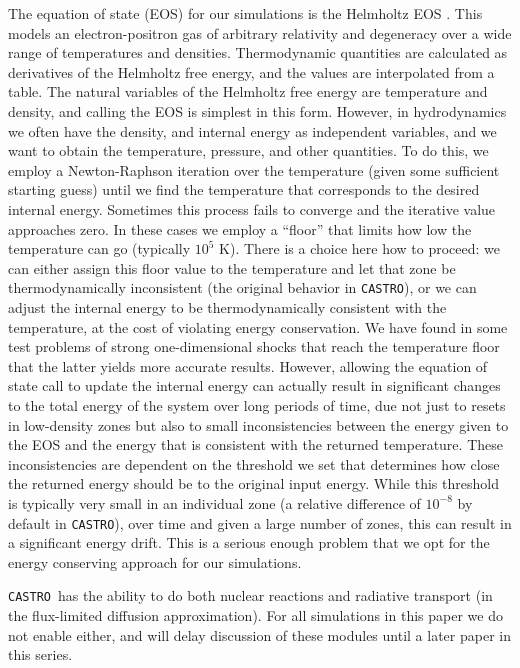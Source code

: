 \documentclass[iop]{../emulateapj}
\newcommand{\castro}{\texttt{CASTRO}}
\begin{document}
The equation of state (EOS) for our simulations is the Helmholtz EOS
\citep{timmes_swesty:2000}. This models an electron-positron gas of
arbitrary relativity and degeneracy over a wide range of temperatures
and densities. Thermodynamic quantities are calculated as derivatives
of the Helmholtz free energy, and the values are interpolated from a
table. The natural variables of the Helmholtz free energy are
temperature and density, and calling the EOS is simplest in this
form. However, in hydrodynamics we often have the density, and
internal energy as independent variables, and we want to obtain the
temperature, pressure, and other quantities. To do this, we employ a
Newton-Raphson iteration over the temperature (given some sufficient
starting guess) until we find the temperature that corresponds to the
desired internal energy. Sometimes this process fails to converge and
the iterative value approaches zero. In these cases we employ a
``floor'' that limits how low the temperature can go (typically 
$10^5$ K). There is a choice here how to proceed: we can either
assign this floor value to the temperature and let that zone be
thermodynamically inconsistent (the original behavior in \castro), or
we can adjust the internal energy to be thermodynamically consistent
with the temperature, at the cost of violating energy conservation. We
have found in some test problems of strong one-dimensional shocks that reach 
the temperature floor that the latter yields more accurate results. 
However, allowing the equation of state call to update the 
internal energy can actually result in significant changes to the 
total energy of the system over long periods of time, 
due not just to resets in low-density zones but also to small 
inconsistencies between the energy given to the EOS and the energy 
that is consistent with the returned temperature. These inconsistencies
are dependent on the threshold we set that determines how close the 
returned energy should be to the original input energy. While this 
threshold is typically very small in an individual zone (a relative 
difference of $10^{-8}$ by default in \castro), over time and given 
a large number of zones, this can result in a significant energy 
drift. This is a serious enough problem that we opt for the energy 
conserving approach for our simulations.

\castro\ has the ability to do both nuclear reactions and radiative 
transport (in the flux-limited diffusion approximation). For all simulations 
in this paper we do not enable either, and will delay discussion of 
these modules until a later paper in this series.
\end{document}
